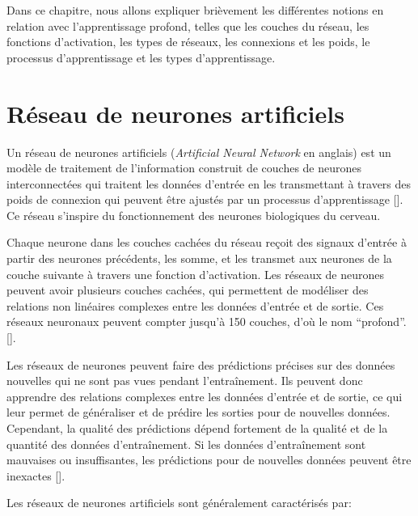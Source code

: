 \medskip
Dans ce chapitre, nous allons expliquer brièvement les différentes notions en relation avec l’apprentissage profond, telles que les couches du réseau, les fonctions d’activation, les types de réseaux, les connexions et les poids, le processus d’apprentissage et les types d’apprentissage.

\section{Réseau de neurones artificiels}
\label{sec:hotspot}
Un réseau de neurones artificiels (\textit{Artificial Neural Network} en anglais) est un modèle de traitement de l'information construit de couches de neurones interconnectées qui traitent les données d'entrée en les transmettant à travers des poids de connexion qui peuvent être ajustés par un processus d'apprentissage [\cite{aggarwal_2018}]. Ce réseau s'inspire du fonctionnement des neurones biologiques du cerveau.

\medskip
Chaque neurone dans les couches cachées du réseau reçoit des signaux d'entrée à partir des neurones précédents, les somme, et les transmet aux neurones de la couche suivante à travers une fonction d'activation. Les réseaux de neurones peuvent avoir plusieurs couches cachées, qui permettent de modéliser des relations non linéaires complexes entre les données d'entrée et de sortie. Ces réseaux neuronaux peuvent compter jusqu’à 150 couches, d'où le nom “profond”. [\cite{Goodfellow-et-al-2016}].

\medskip
Les réseaux de neurones peuvent faire des prédictions précises sur des données nouvelles qui ne sont pas vues pendant l'entraînement. Ils peuvent donc apprendre des relations complexes entre les données d'entrée et de sortie, ce qui leur permet de généraliser et de prédire les sorties pour de nouvelles données. Cependant, la qualité des prédictions dépend fortement de la qualité et de la quantité des données d'entraînement. Si les données d'entraînement sont mauvaises ou insuffisantes, les prédictions pour de nouvelles données peuvent être inexactes [\cite{Goodfellow-et-al-2016}].

\medskip
Les réseaux de neurones artificiels sont généralement caractérisés par:

